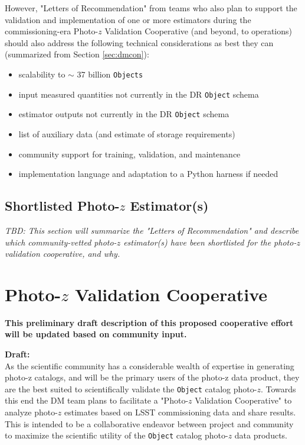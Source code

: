 \documentclass[DM,authoryear,toc]{lsstdoc}
\begin{document}
However, "Letters of Recommendation" from teams who also plan to support the validation and implementation of one or more estimators during the commissioning-era Photo-$z$ Validation Cooperative (and beyond, to operations) should also address the following technical considerations as best they can (summarized from Section \ref{sec:dmcon}):

\begin{itemize}
\item scalability to $\sim$ 37 billion {\tt Objects}
\item input measured quantities not currently in the DR {\tt Object} schema
\item estimator outputs not currently in the DR {\tt Object} schema
\item list of auxiliary data (and estimate of storage requirements)
\item community support for training, validation, and maintenance
\item implementation language and adaptation to a Python harness if needed
\end{itemize}




\subsection{Shortlisted Photo-$z$ Estimator(s)} \label{ssec:lor_choice}

\textit{TBD: This section will summarize the "Letters of Recommendation" and describe which community-vetted photo-$z$ estimator(s) have been shortlisted for the photo-$z$ validation cooperative, and why.}

\section{Photo-$z$ Validation Cooperative}\label{sec:pzcoop}

\textbf{This preliminary draft description of this proposed cooperative effort will be updated based on community input.}

\textbf{Draft:} \\
As the scientific community has a considerable wealth of expertise in generating photo-z catalogs, and will be the primary users of the photo-z data product, they are the best suited to scientifically validate the {\tt Object} catalog photo-$z$.
Towards this end the DM team plans to facilitate a "Photo-$z$ Validation Cooperative" to analyze photo-$z$ estimates based on LSST commissioning data and share results.
This is intended to be a collaborative endeavor between project and community to maximize the scientific utility of the {\tt Object} catalog photo-$z$ data products.
\end{document}
